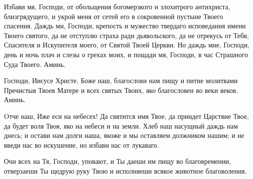 \mychapterending



{\centering {}\par}

\begin{mymulticols}

Избави мя, Господи, от обольщения богомерзкого и злохитрого антихриста, близгрядущего, и укрой меня от сетей его в сокровенной пустыне Твоего спасения. Даждь ми, Господи, крепость и мужество твердаго исповедания имени Твоего святого, да не отступлю страха ради дьявольского, да не отрекусь от Тебя, Спасителя и Искупителя моего, от Святой Твоей Церкви. Но даждь мне, Господи, день и ночь плач и слезы о грехах моих, и пощади мя, Господи, в час Страшного Суда Твоего. Аминь.

\end{mymulticols}

\mychapterending






Господи, Иисусе Христе, Боже наш, благослови нам пищу и питие молитвами Пречистыя Твоея Матере и всех святых Твоих, яко благословен во веки веков. Аминь. 






\mychapterending


\begin{mymulticols}



Oтче наш, Иже еси на небесех! Да святится имя Твое, да приидет Царствие Твое, да будет воля Твоя, яко на небеси и на земли. Хлеб наш насущный даждь нам днесь; и остави нам долги наша, якоже и мы оставляем должником нашим; и не введи нас во искушение, но избави нас от лукаваго.


 Очи всех на Тя, Господи, уповают, и Ты даеши им пищу во благовремении, отверзаеши Ты щедрую руку Твою и исполняеши всякое животное благоволения.

\end{mymulticols}

\mychapterending





